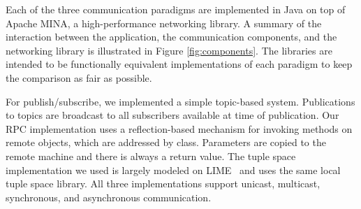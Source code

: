 \documentclass[lnicst]{svmultln}
\begin{document}
Each of the three communication paradigms are implemented in Java on top of Apache MINA\footnotemark, a high-performance networking library. A summary of the interaction between the application, the communication components, and the networking library is illustrated in Figure \ref{fig:components}. The libraries are intended to be functionally equivalent implementations of each paradigm to keep the comparison as fair as possible.

For publish/subscribe, we implemented a simple topic-based system. Publications to topics are broadcast to all subscribers available at time of publication. Our RPC implementation uses a reflection-based mechanism for invoking methods on remote objects, which are addressed by class. Parameters are copied to the remote machine and there is always a return value. The tuple space implementation we used is largely modeled on LIME~\cite{lime} and uses the same local tuple space library. All three implementations support unicast, multicast, synchronous, and asynchronous communication.





\end{document}
